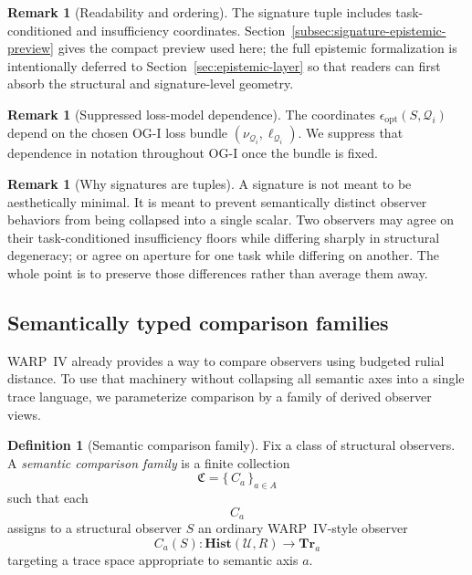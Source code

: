 \documentclass[11pt,twoside]{article}
\theoremstyle{definition}
\newtheorem{definition}[theorem]{Definition}
\newtheorem{remark}[theorem]{Remark}
\newcommand{\Hist}{\mathbf{Hist}}
\newcommand{\Tr}{\mathbf{Tr}}
\begin{document}
\begin{remark}[Readability and ordering]
\label{rem:signature-epistemic-forward-ref}
The signature tuple includes task-conditioned and insufficiency coordinates. Section~\ref{subsec:signature-epistemic-preview} gives the compact preview used here; the full epistemic formalization is intentionally deferred to Section~\ref{sec:epistemic-layer} so that readers can first absorb the structural and signature-level geometry.
\end{remark}

\begin{remark}[Suppressed loss-model dependence]
\label{rem:suppressed-loss-model-dependence}
The coordinates \(\epsilon_{\mathrm{opt}}(S,\mathcal{Q}_i)\) depend on the chosen OG-I loss bundle \((\nu_{\mathcal{Q}_i},\ell_{\mathcal{Q}_i})\). We suppress that dependence in notation throughout OG-I once the bundle is fixed.
\end{remark}

\begin{remark}[Why signatures are tuples]
\label{rem:why-signatures-tuples}
A signature is not meant to be aesthetically minimal. It is meant to prevent semantically distinct observer behaviors from being collapsed into a single scalar. Two observers may agree on their task-conditioned insufficiency floors while differing sharply in structural degeneracy; or agree on aperture for one task while differing on another. The whole point is to preserve those differences rather than average them away.
\end{remark}

\subsection{Semantically typed comparison families}
\label{subsec:semantically-typed-comparison-families}

WARP~IV already provides a way to compare observers using budgeted rulial distance. To use that machinery without collapsing all semantic axes into a single trace language, we parameterize comparison by a family of derived observer views.

\begin{definition}[Semantic comparison family]
\label{def:semantic-comparison-family}
Fix a class of structural observers. A \emph{semantic comparison family} is a finite collection
\[
  \mathfrak{C} = \{\, C_a \,\}_{a\in A}
\]
such that each
\[
  C_a
\]
assigns to a structural observer \(S\) an ordinary WARP~IV-style observer
\[
  C_a(S) : \Hist(\mathcal{U},R)\to \Tr_a
\]
targeting a trace space appropriate to semantic axis \(a\).
\end{definition}
\end{document}
